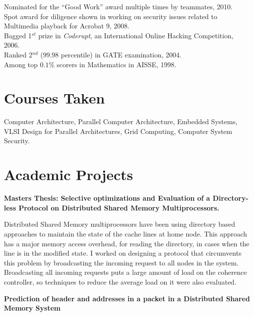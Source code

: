 \documentclass[margin,line]{resume}
\begin{document}
\begin{resume}
	Nominated for the ``Good Work'' award multiple times by teammates, 2010.  \vspace{1mm}\\%
	Spot award for diligence shown in working on security issues related to Multimedia playback for Acrobat 9, 2008.  \vspace{1mm}\\%
	Bagged 1$^{st}$ prize in \textit{Coderupt}, an International Online Hacking Competition, 2006.            \vspace{1mm}\\%
	Ranked 2$^{nd}$ ($99.98$ percentile) in GATE examination, 2004.                                           \vspace{1mm}\\%
	Among top $0.1\%$ scorers in Mathematics in AISSE, 1998.

	\section{\mysidestyle Courses Taken}
	Computer Architecture, Parallel Computer Architecture, Embedded Systems, VLSI Design for Parallel Architectures, Grid Computing, Computer System Security.

	\section{\mysidestyle Academic Projects}

	\textbf{Masters Thesis: Selective optimizations and Evaluation of a Directory-less Protocol on Distributed Shared Memory Multiprocessors.}

	Distributed Shared Memory multiprocessors have been using directory based approaches to maintain the state of the cache lines at home node. This approach has a major memory access overhead, for reading the directory, in cases when the line is in the modified state. I worked on designing a protocol that circumvents this problem by broadcasting the incoming request to all nodes in the system. Broadcasting all incoming requests puts a large amount of load on the coherence controller, so techniques to reduce the average load on it were also evaluated.

	\textbf{Prediction of header and addresses in a packet in a Distributed Shared Memory System}


\end{resume}
\end{document}
